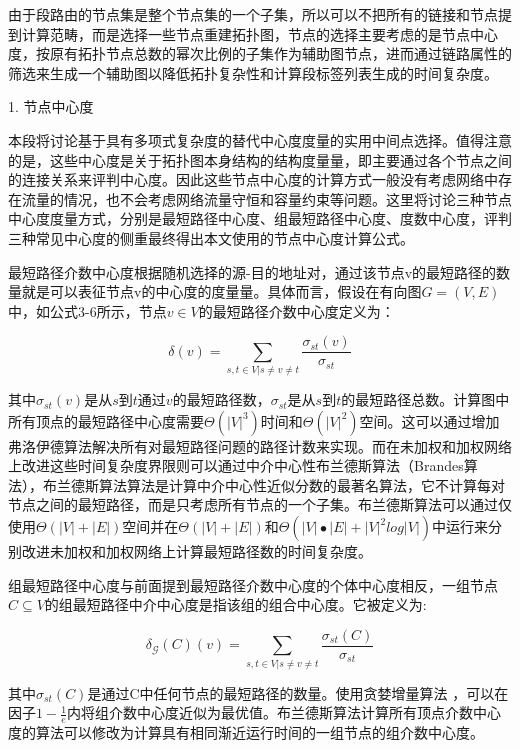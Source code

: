 由于段路由的节点集是整个节点集的一个子集，所以可以不把所有的链接和节点提到计算范畴，而是选择一些节点重建拓扑图，节点的选择主要考虑的是节点中心度，按原有拓扑节点总数的幂次比例的子集作为辅助图节点，进而通过链路属性的筛选来生成一个辅助图以降低拓扑复杂性和计算段标签列表生成的时间复杂度。

1. 节点中心度

本段将讨论基于具有多项式复杂度的替代中心度度量的实用中间点选择。值得注意的是，这些中心度是关于拓扑图本身结构的结构度量量，即主要通过各个节点之间的连接关系来评判中心度。因此这些节点中心度的计算方式一般没有考虑网络中存在流量的情况，也不会考虑网络流量守恒和容量约束等问题。这里将讨论三种节点中心度度量方式，分别是最短路径中心度、组最短路径中心度、度数中心度，评判三种常见中心度的侧重最终得出本文使用的节点中心度计算公式。

最短路径介数中心度根据随机选择的源-目的地址对，通过该节点v的最短路径的数量就是可以表征节点v的中心度的度量量。具体而言，假设在有向图$G=\left(V,E\right)$中，如公式3-6所示，节点$v \in V$的最短路径介数中心度定义为：

\begin{equation} \label{shortest path median centre degree}
    \delta\left(v\right)=\sum_{s,t\in V|s\neq v\neq t}\frac{\sigma_{st}\left(v\right)}{\sigma_{st}}
\end{equation}

其中$\sigma_{st}\left(v\right)$是从$s$到$t$通过$v$的最短路径数，$\sigma_{st}$是从$s$到$t$的最短路径总数。计算图中所有顶点的最短路径中心度需要$\Theta({|V|}^3)$时间和$\Theta({|V|}^2)$空间。这可以通过增加弗洛伊德算法解决所有对最短路径问题的路径计数来实现。而在未加权和加权网络上改进这些时间复杂度界限则可以通过中介中心性布兰德斯算法（Brandes算法），布兰德斯算法算法是计算中介中心性近似分数的最著名算法，它不计算每对节点之间的最短路径，而是只考虑所有节点的一个子集。布兰德斯算法可以通过仅使用$\Theta(|V|+|E|)$空间并在$\Theta(|V|+|E|)$和$\Theta(|V|\bullet|E|+{|V|}^2log|V|)$中运行来分别改进未加权和加权网络上计算最短路径数的时间复杂度。

组最短路径中心度与前面提到最短路径介数中心度的个体中心度相反，一组节点$C\subseteq V$的组最短路径中介中心度是指该组的组合中心度。它被定义为:

\begin{equation} \label{group shortest path centrality}
    \delta_\mathcal{G}(C)\left(v\right)=\sum_{s,t\in V|s\neq v\neq t}\frac{\sigma_{st}\left(C\right)}{\sigma_{st}}
\end{equation}

其中$\sigma_{st}\left(C\right)$是通过C中任何节点的最短路径的数量。使用贪婪增量算法 \cite{SRXXXX3} ，可以在因子$1-\frac{1}{e}$内将组介数中心度近似为最优值。布兰德斯算法计算所有顶点介数中心度的算法可以修改为计算具有相同渐近运行时间的一组节点的组介数中心度。

